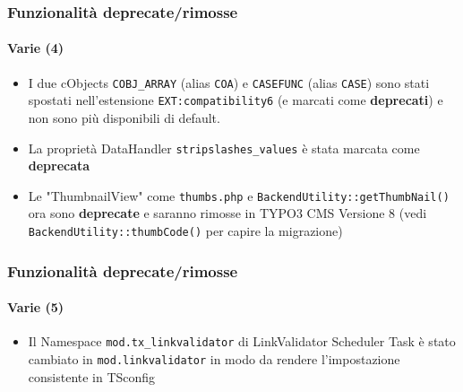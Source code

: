 \begin{frame}[fragile]
	\frametitle{Funzionalità deprecate/rimosse}
	\framesubtitle{Varie (4)}

	\lstset{basicstyle=\tiny\ttfamily}

	\begin{itemize}

		\item I due cObjects
			\small\texttt{COBJ\_ARRAY}\normalsize\space
			(alias \texttt{COA})
			e
			\small\texttt{CASEFUNC}\normalsize\space
			(alias \texttt{CASE})
			sono stati spostati nell'estensione \texttt{EXT:compatibility6}
			(e marcati come \textbf{deprecati}) e non sono più disponibili
			di default.

		\item La proprietà DataHandler
			\small\texttt{stripslashes\_values}\normalsize\space
			è stata marcata come \textbf{deprecata}

		\item Le "ThumbnailView" come \texttt{thumbs.php} e \texttt{BackendUtility::getThumbNail()}
			ora sono \textbf{deprecate} e saranno rimosse in TYPO3 CMS Versione 8\newline
			(vedi \texttt{BackendUtility::thumbCode()} per capire la migrazione)

	\end{itemize}

\end{frame}


\begin{frame}[fragile]
	\frametitle{Funzionalità deprecate/rimosse}
	\framesubtitle{Varie (5)}

	\lstset{basicstyle=\tiny\ttfamily}

	\begin{itemize}

		\item Il Namespace \texttt{mod.tx\_linkvalidator} di LinkValidator
			Scheduler Task è stato cambiato in \texttt{mod.linkvalidator} in modo
			da rendere l'impostazione consistente in TSconfig

	\end{itemize}

\end{frame}

